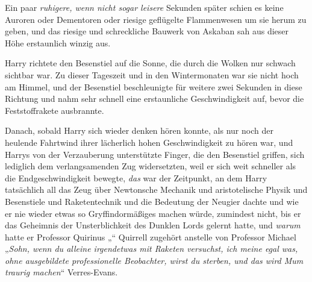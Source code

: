 Ein paar \emph{ruhigere, wenn nicht sogar leisere} Sekunden später schien es keine Auroren oder Dementoren oder riesige geflügelte Flammenwesen um sie herum zu geben, und das riesige und schreckliche Bauwerk von Askaban sah aus dieser Höhe erstaunlich winzig aus.

Harry richtete den Besenstiel auf die Sonne, die durch die Wolken nur schwach sichtbar war. Zu dieser Tageszeit und in den Wintermonaten war sie nicht hoch am Himmel, und der Besenstiel beschleunigte für weitere zwei Sekunden in diese Richtung und nahm sehr schnell eine erstaunliche Geschwindigkeit auf, bevor die Feststoffrakete ausbrannte.

Danach, sobald Harry sich wieder denken hören konnte, als nur noch der heulende Fahrtwind ihrer lächerlich hohen Geschwindigkeit zu hören war, und Harrys von der Verzauberung unterstützte Finger, die den Besenstiel griffen, sich lediglich dem verlangsamenden Zug widersetzten, weil er sich weit schneller als die Endgeschwindigkeit bewegte, \emph{das} war der Zeitpunkt, an dem Harry tatsächlich all das Zeug über Newtonsche Mechanik und aristotelische Physik und Besenstiele und Raketentechnik und die Bedeutung der Neugier dachte und wie er nie wieder etwas so Gryffindormäßiges machen würde, zumindest nicht, bis er das Geheimnis der Unsterblichkeit des Dunklen Lords gelernt hatte, und \emph{warum} hatte er Professor Quirinus „“ Quirrell zugehört anstelle von Professor Michael „\emph{Sohn, wenn du alleine irgendetwas mit Raketen versuchst, ich meine \emph{egal was}, ohne ausgebildete professionelle Beobachter, wirst du sterben, und das wird Mum traurig machen}“ Verres-Evans.

